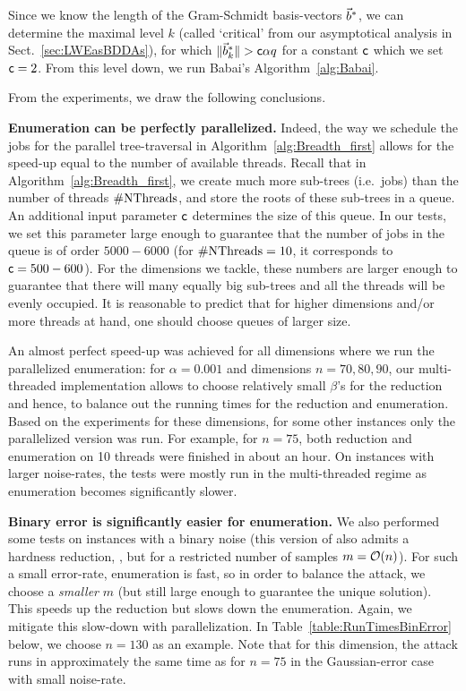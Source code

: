 Since we know the length of the Gram-Schmidt basis-vectors $\vec b^*$, we can determine the maximal level $k$ (called `critical' from our asymptotical analysis in Sect.~\ref{sec:LWEasBDDAs}), for which $\|\vec b^*_k \| > \mathsf{c} \alpha q$ for a constant $\mathsf{c}$ which we set $\mathsf{c} = 2$. From this level down, we run Babai's Algorithm~\ref{alg:Babai}.

From the experiments, we draw the following conclusions. 
	
\vspace{8pt} \hspace{5pt} \textbf{Enumeration can be perfectly parallelized.} Indeed, the way we schedule the jobs for the parallel tree-traversal in Algorithm~\ref{alg:Breadth_first} allows for the speed-up equal to the number of available threads. Recall that in Algorithm~\ref{alg:Breadth_first}, we create much more sub-trees (i.e.\ jobs) than the number of threads $\mathrm{\#NThreads}$, and store the roots of these sub-trees in a queue. An additional input parameter $\mathsf{c}$ determines the size of this queue. In our tests, we set this parameter large enough to guarantee that the number of jobs in the queue is of order $5000-6000$ (for $\mathrm{\#NThreads} = 10$, it corresponds to $\mathsf{c}=500-600$). For the dimensions we tackle, these numbers are larger enough to guarantee that there will many equally big sub-trees and all the threads will be evenly occupied. It is reasonable to predict that for higher dimensions and/or more threads at hand, one should choose queues of larger size. 

An almost perfect speed-up was achieved for all dimensions where we run the parallelized enumeration: for $\alpha=0.001$ and dimensions $n=70,80,90$, our multi-threaded implementation allows to choose relatively small $\beta$'s for the reduction and hence, to balance out the running times for the reduction and enumeration. Based on the experiments for these dimensions, for some other instances only the parallelized version was run. For example, for $n=75$, both reduction and enumeration on 10 threads were finished in about an hour. On instances with larger noise-rates, the tests were mostly run in the multi-threaded regime as enumeration becomes significantly slower.


\vspace{8pt} \hspace{5pt} \textbf{Binary error is significantly easier for enumeration.} We also performed some tests on instances with a binary noise (this version of \LWE also admits a hardness reduction, \cite{C:MicPei13}, but for a restricted number of samples $m = \mathcal{O}(n)$). For such a small error-rate, enumeration is fast, so in order to balance the attack, we choose a \emph{smaller} $m$ (but still large enough to guarantee the unique solution). This speeds up the reduction but slows down the enumeration. Again, we mitigate this slow-down with parallelization. In Table~\ref{table:RunTimesBinError} below, we choose $n=130$ as an example. Note that for this dimension, the attack runs in approximately the same time as for $n=75$ in the Gaussian-error case with small noise-rate.  


